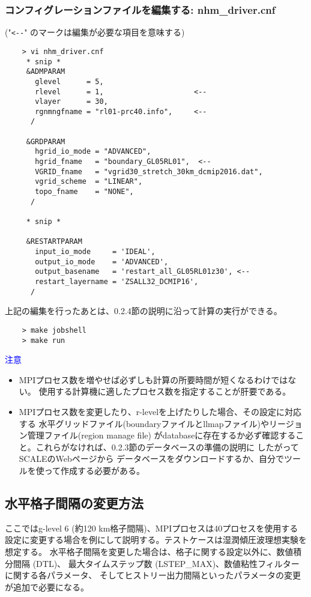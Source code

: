 \subsubsection{コンフィグレーションファイルを編集する: nhm\_driver.cnf}
 ("\verb|<--|" のマークは編集が必要な項目を意味する)
 \begin{verbatim}
    > vi nhm_driver.cnf
     * snip *
     &ADMPARAM
       glevel      = 5,
       rlevel      = 1,                     <--
       vlayer      = 30,
       rgnmngfname = "rl01-prc40.info",     <--
      /

     &GRDPARAM
       hgrid_io_mode = "ADVANCED",
       hgrid_fname   = "boundary_GL05RL01",  <--
       VGRID_fname   = "vgrid30_stretch_30km_dcmip2016.dat",
       vgrid_scheme  = "LINEAR",
       topo_fname    = "NONE",
      /

     * snip *

     &RESTARTPARAM
       input_io_mode     = 'IDEAL',
       output_io_mode    = 'ADVANCED',
       output_basename   = 'restart_all_GL05RL01z30', <--
       restart_layername = 'ZSALL32_DCMIP16',
      /
 \end{verbatim}

 \noindent 上記の編集を行ったあとは、0.2.4節の説明に沿って計算の実行ができる。
 \begin{verbatim}
    > make jobshell
    > make run
 \end{verbatim}

 \noindent \textcolor{blue}{{\sf 注意}}
 \begin{itemize}
   \item MPIプロセス数を増やせば必ずしも計算の所要時間が短くなるわけではない。
           使用する計算機に適したプロセス数を指定することが肝要である。
   \item MPIプロセス数を変更したり、r-levelを上げたりした場合、その設定に対応する
           水平グリッドファイル(boundaryファイルとllmapファイル)やリージョン管理ファイル(region manage file)
           がdatabaseに存在するか必ず確認すること。これらがなければ、0.2.3節のデータベースの準備の説明に
           したがってSCALEのWebページから
           データベースをダウンロードするか、自分でツールを使って作成する必要がある。
 \end{itemize}




\subsection{水平格子間隔の変更方法}
 \noindent ここではg-level 6 (約120 km格子間隔)、MPIプロセスは40プロセスを使用する
設定に変更する場合を例にして説明する。テストケースは湿潤傾圧波理想実験を想定する。
水平格子間隔を変更した場合は、格子に関する設定以外に、数値積分間隔 (DTL)、
最大タイムステップ数 (LSTEP\_MAX)、数値粘性フィルターに関する各パラメータ、
そしてヒストリー出力間隔といったパラメータの変更が追加で必要になる。

